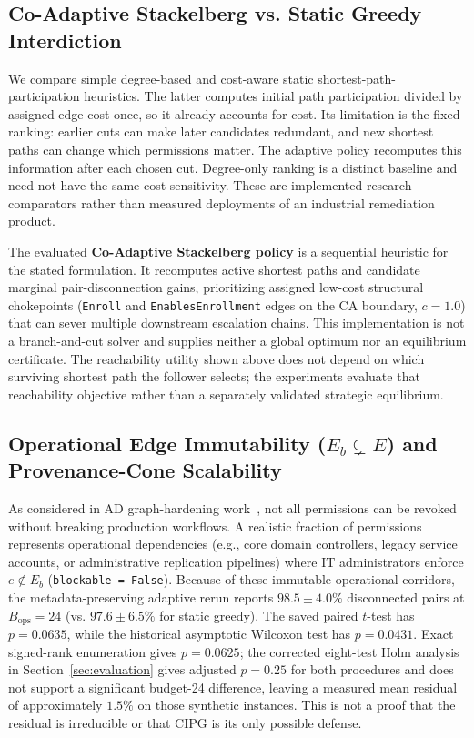 \subsection{Co-Adaptive Stackelberg vs. Static Greedy Interdiction}
We compare simple degree-based and cost-aware static shortest-path-participation heuristics. The latter computes initial path participation divided by assigned edge cost once, so it already accounts for cost. Its limitation is the fixed ranking: earlier cuts can make later candidates redundant, and new shortest paths can change which permissions matter. The adaptive policy recomputes this information after each chosen cut. Degree-only ranking is a distinct baseline and need not have the same cost sensitivity. These are implemented research comparators rather than measured deployments of an industrial remediation product.

The evaluated \textbf{Co-Adaptive Stackelberg policy} is a sequential heuristic for the stated formulation. It recomputes active shortest paths and candidate marginal pair-disconnection gains, prioritizing assigned low-cost structural chokepoints (\texttt{Enroll} and \texttt{EnablesEnrollment} edges on the CA boundary, $c = 1.0$) that can sever multiple downstream escalation chains. This implementation is not a branch-and-cut solver and supplies neither a global optimum nor an equilibrium certificate. The reachability utility shown above does not depend on which surviving shortest path the follower selects; the experiments evaluate that reachability objective rather than a separately validated strategic equilibrium.

\subsection{Operational Edge Immutability ($E_b \subsetneq E$) and Provenance-Cone Scalability}
As considered in AD graph-hardening work~\cite{goel2024hardening}, not all permissions can be revoked without breaking production workflows. A realistic fraction of permissions represents operational dependencies (e.g., core domain controllers, legacy service accounts, or administrative replication pipelines) where IT administrators enforce $e \notin E_b$ (\texttt{blockable = False}). Because of these immutable operational corridors, the metadata-preserving adaptive rerun reports $98.5 \pm 4.0\%$ disconnected pairs at $B_{\text{ops}}=24$ (vs. $97.6 \pm 6.5\%$ for static greedy). The saved paired $t$-test has $p=0.0635$, while the historical asymptotic Wilcoxon test has $p=0.0431$. Exact signed-rank enumeration gives $p=0.0625$; the corrected eight-test Holm analysis in Section~\ref{sec:evaluation} gives adjusted $p=0.25$ for both procedures and does not support a significant budget-24 difference, leaving a measured mean residual of approximately $1.5\%$ on those synthetic instances. This is not a proof that the residual is irreducible or that CIPG is its only possible defense.

